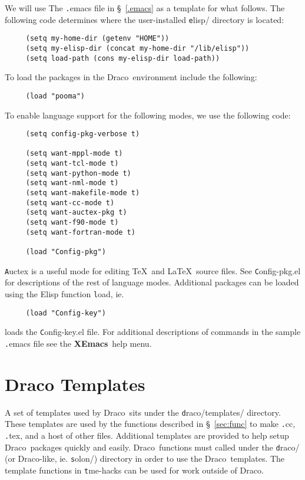\documentclass[11pt]{nmemo}
\newcommand{\comp}[1]{{\normalfont\texttt#1}}
\newcommand{\draco}{{\normalfont\sffamily Draco}}
\newcommand{\xemacs}{{\normalfont\bfseries XEmacs}}
\begin{document}
We will use The \comp{.emacs} file in \S~\ref{.emacs} as a template
for what follows.  The following code determines where the
user-installed \comp{elisp/} directory is located:
\begin{verbatim}
     (setq my-home-dir (getenv "HOME"))
     (setq my-elisp-dir (concat my-home-dir "/lib/elisp"))
     (setq load-path (cons my-elisp-dir load-path))
\end{verbatim}
To load the packages in the \draco\ environment include the following:
\begin{verbatim}
     (load "pooma")
\end{verbatim}
To enable language support for the following modes, we use the
following code:
\begin{verbatim}
     (setq config-pkg-verbose t)

     (setq want-mppl-mode t)
     (setq want-tcl-mode t)
     (setq want-python-mode t)
     (setq want-nml-mode t)
     (setq want-makefile-mode t)
     (setq want-cc-mode t)
     (setq want-auctex-pkg t)
     (setq want-f90-mode t)
     (setq want-fortran-mode t)

     (load "Config-pkg")
\end{verbatim}
\comp{Auctex} is a useful mode for editing \TeX\ and \LaTeX\ source
files.  See \comp{Config-pkg.el} for descriptions of the rest of
language modes.  Additional packages can be loaded using the Elisp
function \comp{load}, ie. 
\begin{verbatim}
     (load "Config-key")
\end{verbatim}
loads the \comp{Config-key.el} file.  For additional descriptions of
commands in the sample \comp{.emacs} file see the \xemacs\ help menu.


\section{Draco Templates}

A set of templates used by \draco\ sits under the
\comp{draco/templates/} directory.  These templates are used by the
functions described in \S~\ref{sec:func} to make \comp{.cc},
\comp{.tex}, and a host of other files.  Additional templates are
provided to help setup \draco\ packages quickly and easily.  \draco\
functions must called under the \comp{draco/} (or \draco-like,
ie. \comp{solon/}) directory in order to use the \draco\ templates.
The template functions in \comp{tme-hacks} can be used for work
outside of \draco.
\end{document}

